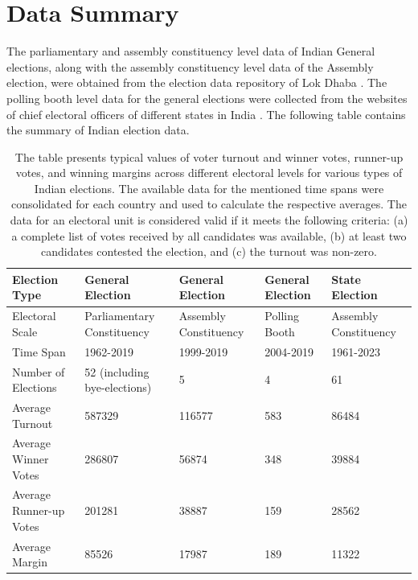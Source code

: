 \documentclass[reprint, pre, twocolumn, aps, showpacs, superscriptaddress]{revtex4-2}
\begin{document}
\section{Data Summary}
\noindent The parliamentary and assembly constituency level data of Indian General elections, along with the assembly constituency level data of the Assembly election, were obtained from the election data repository of Lok Dhaba \cite{lokdhaba}. The polling booth level data for the general elections were collected from the websites of chief electoral officers of different states in India \cite{india_data}. The following table contains the summary of Indian election data.
\begin{table}[h]
\centering
\begin{tabular}{|l|l|l|l|l|}
\hline
Election Type & General Election & General Election & General Election & State Election \\
\hline  
Electoral Scale & Parliamentary Constituency & Assembly Constituency & Polling Booth & Assembly Constituency \\
\hline
Time Span &  1962-2019& 1999-2019 & 2004-2019 & 1961-2023 \\
\hline
Number of Elections &  52 (including bye-elections)& 5 & 4 & 61\\
\hline
Average Turnout & 587329& 116577& 583& 86484\\
\hline
Average Winner Votes & 286807& 56874& 348& 39884\\
\hline
Average Runner-up Votes & 201281& 38887& 159& 28562\\
\hline
Average Margin & 85526& 17987& 189& 11322\\
\hline
\end{tabular}
\caption{The table presents typical values of voter turnout and winner votes, runner-up votes, and winning margins across different electoral levels for various types of Indian elections. The available data for the mentioned time spans were consolidated for each country and used to calculate the respective averages. The data for an electoral unit is considered valid if it meets the following criteria:  (a) a complete list of votes received by all candidates was available, (b) at least two candidates contested the election, and (c) the turnout was non-zero.}
\label{table}
\end{table}
\end{document}
